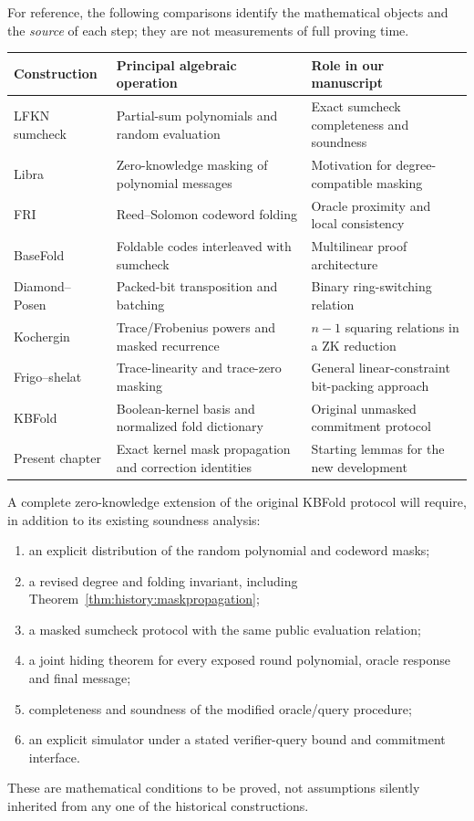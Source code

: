For reference, the following comparisons identify the mathematical objects and the \emph{source} of each step; they are not measurements of full proving time.
\begin{center}
\small
\begin{tabular}{p{.20\linewidth}p{.32\linewidth}p{.36\linewidth}}
\hline
Construction & Principal algebraic operation & Role in our manuscript\\
\hline
LFKN sumcheck~\cite{LFKN1992} & Partial-sum polynomials and random evaluation & Exact sumcheck completeness and soundness\\
Libra~\cite{XieEtAl2019Libra} & Zero-knowledge masking of polynomial messages & Motivation for degree-compatible masking\\
FRI~\cite{BBHR2018} & Reed--Solomon codeword folding & Oracle proximity and local consistency\\
BaseFold~\cite{ZCF2023} & Foldable codes interleaved with sumcheck & Multilinear proof architecture\\
Diamond--Posen~\cite{DiamondPosen2024} & Packed-bit transposition and batching & Binary ring-switching relation\\
Kochergin~\cite{Kochergin2026} & Trace/Frobenius powers and masked recurrence & $n-1$ squaring relations in a ZK reduction\\
Frigo--shelat~\cite{FrigoShelat2026} & Trace-linearity and trace-zero masking & General linear-constraint bit-packing approach\\
KBFold~\cite{MkhidaKBFold2026} & Boolean-kernel basis and normalized fold dictionary & Original unmasked commitment protocol\\
Present chapter & Exact kernel mask propagation and correction identities & Starting lemmas for the new development\\
\hline
\end{tabular}
\end{center}

\begin{definition}\label{def:history:obligations}
A complete zero-knowledge extension of the original KBFold protocol will require, in addition to its existing soundness analysis:
\begin{enumerate}[label=\textup{(\roman*)}]
 \item an explicit distribution of the random polynomial and codeword masks;
 \item a revised degree and folding invariant, including Theorem~\ref{thm:history:maskpropagation};
 \item a masked sumcheck protocol with the same public evaluation relation;
 \item a joint hiding theorem for every exposed round polynomial, oracle response and final message;
 \item completeness and soundness of the modified oracle/query procedure;
 \item an explicit simulator under a stated verifier-query bound and commitment interface.
\end{enumerate}
These are mathematical conditions to be proved, not assumptions silently inherited from any one of the historical constructions.
\end{definition}

